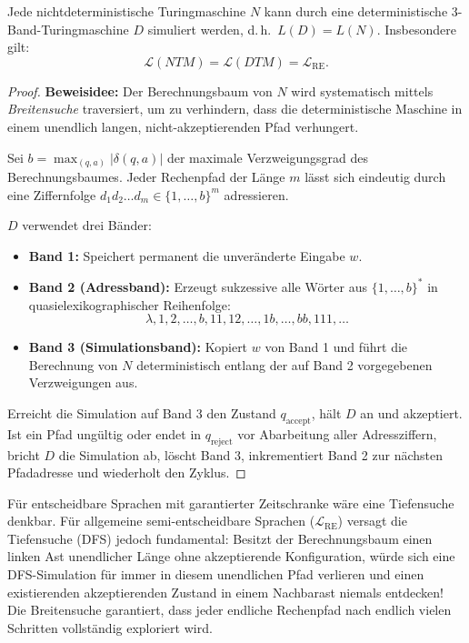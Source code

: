 \begin{theorem}
    Jede nichtdeterministische Turingmaschine $N$ kann durch eine deterministische 3-Band-Turingmaschine $D$ simuliert werden, d.\,h.\ $L(D) = L(N)$. Insbesondere gilt:
    \[
        \mathcal{L}(NTM) = \mathcal{L}(DTM) = \mathcal{L}_{\mathrm{RE}}.
    \]
\end{theorem}

\begin{proof}
    \textbf{Beweisidee:} Der Berechnungsbaum von $N$ wird systematisch mittels \emph{Breitensuche} traversiert, um zu verhindern, dass die deterministische Maschine in einem unendlich langen, nicht-akzeptierenden Pfad verhungert.
    
    Sei $b = \max_{(q, a)} |\delta(q, a)|$ der maximale Verzweigungsgrad des Berechnungsbaumes. Jeder Rechenpfad der Länge $m$ lässt sich eindeutig durch eine Ziffernfolge $d_1 d_2 \dots d_m \in \{1, \dots, b\}^m$ adressieren.
    
    $D$ verwendet drei Bänder:
    \begin{itemize}
        \item \textbf{Band 1:} Speichert permanent die unveränderte Eingabe $w$.
        \item \textbf{Band 2 (Adressband):} Erzeugt sukzessive alle Wörter aus $\{1, \dots, b\}^*$ in quasielexikographischer Reihenfolge:
        \[
            \lambda, 1, 2, \dots, b, 11, 12, \dots, 1b, \dots, bb, 111, \dots
        \]
        \item \textbf{Band 3 (Simulationsband):} Kopiert $w$ von Band 1 und führt die Berechnung von $N$ deterministisch entlang der auf Band 2 vorgegebenen Verzweigungen aus.
    \end{itemize}
    Erreicht die Simulation auf Band 3 den Zustand $q_{\mathrm{accept}}$, hält $D$ an und akzeptiert. Ist ein Pfad ungültig oder endet in $q_{\mathrm{reject}}$ vor Abarbeitung aller Adressziffern, bricht $D$ die Simulation ab, löscht Band 3, inkrementiert Band 2 zur nächsten Pfadadresse und wiederholt den Zyklus.
\end{proof}

\begin{important}
    Für entscheidbare Sprachen mit garantierter Zeitschranke wäre eine Tiefensuche denkbar. Für allgemeine semi-entscheidbare Sprachen ($\mathcal{L}_{\mathrm{RE}}$) versagt die Tiefensuche (DFS) jedoch fundamental: Besitzt der Berechnungsbaum einen linken Ast unendlicher Länge ohne akzeptierende Konfiguration, würde sich eine DFS-Simulation für immer in diesem unendlichen Pfad verlieren und einen existierenden akzeptierenden Zustand in einem Nachbarast niemals entdecken! Die Breitensuche garantiert, dass jeder endliche Rechenpfad nach endlich vielen Schritten vollständig exploriert wird.
\end{important}

